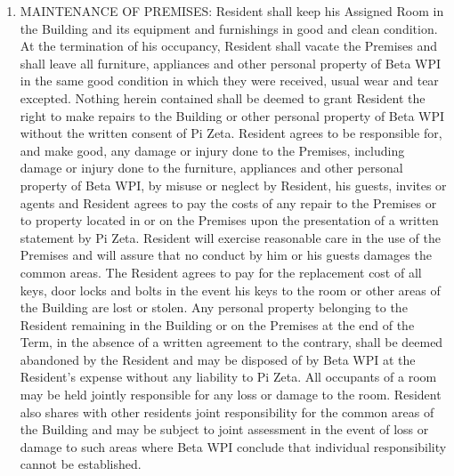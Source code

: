 \documentclass[legalpaper, 12pt]{article} \usepackage{lease}
\begin{document}
\begin{enumerate}
        \item MAINTENANCE OF PREMISES: Resident shall keep his Assigned Room in
                the Building and its equipment and furnishings in good and clean
                condition.  At the termination of his occupancy, Resident shall
                vacate the Premises and shall leave all furniture, appliances
                and other personal property of Beta WPI in the same good
                condition in which they were received, usual wear and tear
                excepted.  Nothing herein contained shall be deemed to grant
                Resident the right to make repairs to the Building or other
                personal property of Beta WPI without the written consent of Pi
                Zeta.  Resident agrees to be responsible for, and make good, any
                damage or injury done to the Premises, including damage or
                injury done to the furniture, appliances and other personal
                property of Beta WPI, by misuse or neglect by Resident, his
                guests, invites or agents and Resident agrees to pay the costs
                of any repair to the Premises or to property located in or on
                the Premises upon the presentation of a written statement by Pi
                Zeta.  Resident will exercise reasonable care in the use of the
                Premises and will assure that no conduct by him or his guests
                damages the common areas.  The Resident agrees to pay for the
                replacement cost of all keys, door locks and bolts in the event
                his keys to the room or other areas of the Building are lost or
                stolen.  Any personal property belonging to the Resident
                remaining in the Building or on the Premises at the end of the
                Term, in the absence of a written agreement to the contrary,
                shall be deemed abandoned by the Resident and may be disposed of
                by Beta WPI at the Resident’s expense without any liability to
                Pi Zeta. All occupants of a room may be held jointly responsible
                for any loss or damage to the room. Resident also shares with
                other residents joint responsibility for the common areas of the
                Building and may be subject to joint assessment in the event of
                loss or damage to such areas where Beta WPI conclude that
                individual responsibility cannot be established.


\end{enumerate}
\end{document}
